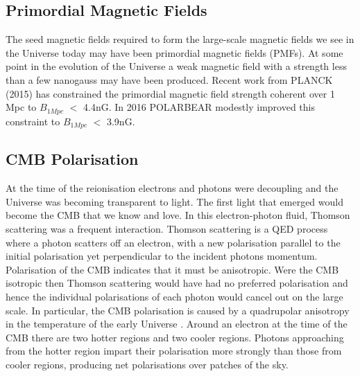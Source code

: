 \iffalse
> What?
	- weak magnetic fields coherent over kilo to megaparsec scales
	- evidence: Faraday rotation + synchrotron emission + zeeman effect
	- currently unknown how they originated
> How?
	- hydrodynamics
	- stars
	- pmfs
\fi
\subsection{Primordial Magnetic Fields}

The seed magnetic fields required to form the large-scale magnetic fields we see in the Universe today may have been primordial magnetic fields (PMFs). At some point in the evolution of the Universe a weak magnetic field with a strength less than a few nanogauss may have been produced. Recent work from PLANCK (2015) has constrained the primordial magnetic field strength coherent over 1 Mpc to $B_{1Mpc}$ $<$ 4.4nG. In 2016 POLARBEAR modestly improved this constraint to $B_{1Mpc}$ $<$ 3.9nG.

\iffalse
	- seed magnetic field produced in the early universe
	- undetected
	- predicted magnitude of < 1 nG.
	- evolves through magnetohydrodynamical processes
\fi

\subsection{CMB Polarisation}
At the time of the reionisation electrons and photons were decoupling and the Universe was becoming transparent to light. The first light that emerged would become the CMB that we know and love. In this electron-photon fluid, Thomson scattering was a frequent interaction. Thomson scattering is a QED process where a photon scatters off an electron, with a new polarisation parallel to the initial polarisation yet perpendicular to the incident photons momentum.
	Polarisation of the CMB indicates that it must be anisotropic. Were the CMB isotropic then Thomson scattering would have had no preferred polarisation and hence the individual polarisations of each photon would cancel out on the large scale. In particular, the CMB polarisation is caused by a quadrupolar anisotropy in the temperature of the early Universe \cite{Hu:1997hv}. Around an electron at the time of the CMB there are two hotter regions and two cooler regions. Photons approaching from the hotter region impart their polarisation more strongly than those from cooler regions, producing net polarisations over patches of the sky.

